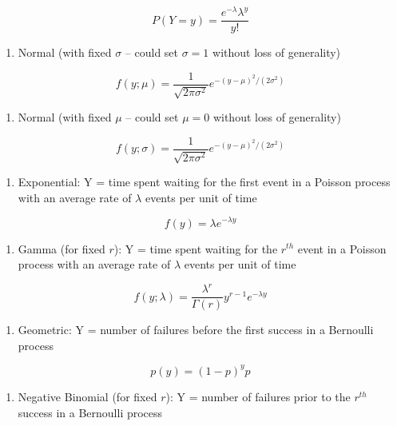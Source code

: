 \documentclass[
]{krantz}
\providecommand{\tightlist}{%
  \setlength{\itemsep}{0pt}\setlength{\parskip}{0pt}}
\begin{document}
\[
  P(Y=y)=\frac{e^{-\lambda}\lambda^y}{y!}
  \]

\begin{enumerate}
\def\labelenumi{\alph{enumi})}
\setcounter{enumi}{3}
\tightlist
\item
  Normal (with fixed \(\sigma\) -- could set \(\sigma=1\) without loss of generality)
\end{enumerate}

\[f(y; \mu)=\frac{1}{\sqrt{2\pi\sigma^2}}e^{-{(y-\mu)^2}/{(2\sigma^2)}}\]

\begin{enumerate}
\def\labelenumi{\alph{enumi})}
\setcounter{enumi}{4}
\tightlist
\item
  Normal (with fixed \(\mu\) -- could set \(\mu=0\) without loss of generality)
\end{enumerate}

\[f(y; \sigma)=\frac{1}{\sqrt{2\pi\sigma^2}}e^{-{(y-\mu)^2}/{(2\sigma^2)}}\]

\begin{enumerate}
\def\labelenumi{\alph{enumi})}
\setcounter{enumi}{5}
\tightlist
\item
  Exponential: Y = time spent waiting for the first event in a Poisson process with an average rate of \(\lambda\) events per unit of time
\end{enumerate}

\[f(y)=\lambda e^{-\lambda y}\]

\begin{enumerate}
\def\labelenumi{\alph{enumi})}
\setcounter{enumi}{6}
\tightlist
\item
  Gamma (for fixed \(r\)): Y = time spent waiting for the \(r^{th}\) event in a Poisson process with an average rate of \(\lambda\) events per unit of time
\end{enumerate}

\[f(y; \lambda) = \frac{\lambda^r}{\Gamma(r)} y^{r-1} e^{-\lambda y}\]

\begin{enumerate}
\def\labelenumi{\alph{enumi})}
\setcounter{enumi}{7}
\tightlist
\item
  Geometric: Y = number of failures before the first success in a Bernoulli process
\end{enumerate}

\[p(y)=(1-p)^{y}p\]

\begin{enumerate}
\def\labelenumi{\roman{enumi})}
\tightlist
\item
  Negative Binomial (for fixed \(r\)): Y = number of failures prior to the \(r^{th}\) success in a Bernoulli process
\end{enumerate}
\end{document}
